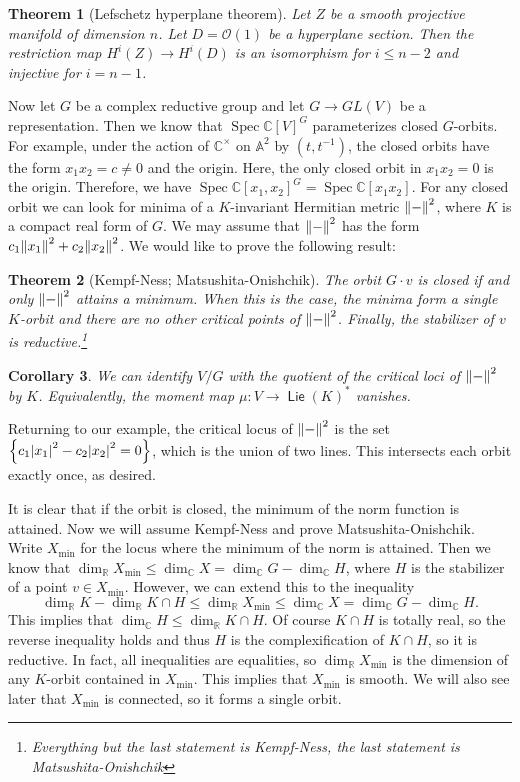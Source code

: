 \documentclass[leqno, openany]{memoir}
\newtheorem{thm}{Theorem}[section]
\newtheorem{cor}[thm]{Corollary}
\theoremstyle{definition}
\theoremstyle{remark}
\theoremstyle{plain}
\theoremstyle{definition}
\theoremstyle{remark}
\newcommand{\A}{\mathbb{A}}
\newcommand{\R}{\mathbb{R}}
\newcommand{\C}{\mathbb{C}}
\newcommand{\msc}[1]{\mathscr{#1}}
\DeclareMathOperator{\Spec}{Spec}
\DeclareMathOperator{\Lie}{\mathsf{Lie}}
\begin{document}
\begin{thm}[Lefschetz hyperplane theorem]
    Let $Z$ be a smooth projective manifold of dimension $n$. Let $D = \msc{O}(1)$ be a hyperplane section. Then the restriction map $H^i(Z) \to H^i(D)$ is an isomorphism for $i \leq n-2$ and injective for $i = n-1$.
\end{thm}

Now let $G$ be a complex reductive group and let $G \to GL(V)$ be a representation. Then we know that $\Spec {\C[V]}^G$ parameterizes closed $G$-orbits. For example, under the action of $\C^{\times}$ on $\A^2$ by $(t, t^{-1})$, the closed orbits have the form $x_1x_2 = c \neq 0$ and the origin. Here, the only closed orbit in $x_1x_2 = 0$ is the origin. Therefore, we have $\Spec {\C[x_1,x_2]}^G = \Spec \C[x_1x_2]$. For any closed orbit we can look for minima of a $K$-invariant Hermitian metric $\norm{-}^2$, where $K$ is a compact real form of $G$. We may assume that $\norm{-}^2$ has the form $c_1 \norm{x_1}^2 + c_2 \norm{x_2}^2$. We would like to prove the following result:

\begin{thm}[Kempf-Ness; Matsushita-Onishchik]
    The orbit $G\cdot v$ is closed if and only $\norm{-}^2$ attains a minimum. When this is the case, the minima form a single $K$-orbit and there are no other critical points of $\norm{-}^2$. Finally, the stabilizer of $v$ is reductive.\footnote{Everything but the last statement is Kempf-Ness, the last statement is Matsushita-Onishchik}
\end{thm}

\begin{cor}
    We can identify $V/G$ with the quotient of the critical loci of $\norm{-}^2$ by $K$. Equivalently, the moment map $\mu \colon V \to {\Lie(K)}^*$ vanishes.
\end{cor}

Returning to our example, the critical locus of $\norm{-}^2$ is the set $\qty{c_1 \abs{x_1}^2 - c_2 \abs{x_2}^2 = 0}$, which is the union of two lines. This intersects each orbit exactly once, as desired.

It is clear that if the orbit is closed, the minimum of the norm function is attained. Now we will assume Kempf-Ness and prove Matsushita-Onishchik. Write $X_{\min}$ for the locus where the minimum of the norm is attained. Then we know that $\dim_{\R} X_{\min} \leq \dim_{\C} X = \dim_{\C} G - \dim_{\C} H$, where $H$ is the stabilizer of a point $v \in X_{\min}$. However, we can extend this to the inequality
\[ \dim_{\R} K - \dim_{\R} K \cap H \leq \dim_{\R} X_{\min} \leq \dim_{\C} X = \dim_{\C} G - \dim_{\C} H. \]
This implies that $\dim_{\C} H \leq \dim_{\R} K \cap H$. Of course $K \cap H$ is totally real, so the reverse inequality holds and thus $H$ is the complexification of $K \cap H$, so it is reductive. In fact, all inequalities are equalities, so $\dim_{\R} X_{\min}$ is the dimension of any $K$-orbit contained in $X_{\min}$. This implies that $X_{\min}$ is smooth. We will also see later that $X_{\min}$ is connected, so it forms a single orbit.
\end{document}
